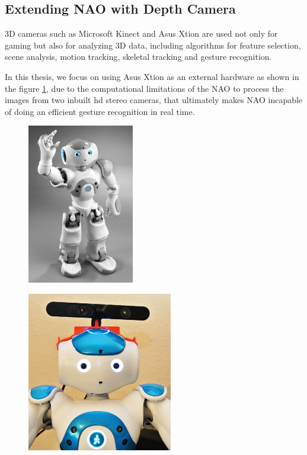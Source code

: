 \subsection{Extending NAO with Depth Camera} 
3D cameras such as Microsoft Kinect and Asus Xtion are used not only for gaming but also for analyzing 3D data, including algorithms for feature selection, scene analysis, motion tracking, skeletal tracking and gesture recognition. 

In this thesis, we focus on using Asus Xtion as an external hardware as shown in the figure \ref{fig:xtion}, due to the computational limitations of the NAO to process the images from two inbuilt hd stereo cameras, that ultimately makes NAO incapable of doing an efficient gesture recognition in real time.

\begin{figure}
	\centering
	\begin{minipage}{.5\textwidth}
		\centering
\includegraphics[height=7cm]{figures/nao.png} 
		\label{fig:nao}
	\end{minipage}%
	\begin{minipage}{.5\textwidth}
		\centering
\includegraphics[height=7cm]{figures/nao-xtion.png} 
		\label{fig:xtion}
	\end{minipage}
\end{figure}


